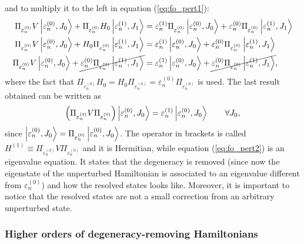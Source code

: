and to multiply it to the left in equation (\ref{eq:fo_pert1}): 
\begin{align*}
    \Pi_{\varepsilon^{(0)}_n} V \ket{\varepsilon^{(0)}_n,J_0} + \Pi_{\varepsilon^{(0)}_n} H_0 \ket{\varepsilon^{(1)}_n,J_1} &= \varepsilon^{(1)}_n \Pi_{\varepsilon^{(0)}_n} \ket{\varepsilon^{(0)}_n,J_0} + \varepsilon^{(0)}_n \Pi_{\varepsilon^{(0)}_n} \ket{\varepsilon^{(1)}_n,J_1} \\
     \Pi_{\varepsilon^{(0)}_n} V \ket{\varepsilon^{(0)}_n,J_0} +  H_0 \Pi_{\varepsilon^{(0)}_n} \ket{\varepsilon^{(1)}_n,J_1} &= \varepsilon^{(1)}_n  \ket{\varepsilon^{(0)}_n,J_0} + \varepsilon^{(0)}_n \Pi_{\varepsilon^{(0)}_n} \ket{\varepsilon^{(1)}_n,J_1} \\
      \Pi_{\varepsilon^{(0)}_n} V \ket{\varepsilon^{(0)}_n,J_0} +  \cancel{\varepsilon^{(0)}_n \Pi_{\varepsilon^{(0)}_n} \ket{\varepsilon^{(1)}_n,J_1}} &= \varepsilon^{(1)}_n  \ket{\varepsilon^{(0)}_n,J_0} + \cancel{\varepsilon^{(0)}_n \Pi_{\varepsilon^{(0)}_n} \ket{\varepsilon^{(1)}_n,J_1}},
\end{align*}
where the fact that $ \Pi_{\varepsilon^{(0)}_n} H_0 = H_0 \Pi_{\varepsilon^{(0)}_n} =\varepsilon^{(0)}_n \Pi_{\varepsilon^{(0)}_n}$ is used. The last result obtained can be written as
\begin{equation}
    \label{eq:fo_pert2}
    \left( \Pi_{\varepsilon^{(0)}_n} V \Pi_{\varepsilon^{(0)}_n} \right) \ket{\varepsilon^{(0)}_n,J_0} = \varepsilon^{(1)}_n  \ket{\varepsilon^{(0)}_n,J_0} \qquad \forall J_0,
\end{equation}
since $\ket{\varepsilon^{(0)}_n,J_0} = \Pi_{\varepsilon^{(0)}_n} \ket{\varepsilon^{(0)}_n,J_0}$. The operator in brackets is called $H^{(1)} \equiv \Pi_{\varepsilon^{(0)}_n} V \Pi_{\varepsilon^{(0)}_n}$ and it is Hermitian, while equation (\ref{eq:fo_pert2}) is an eigenvalue equation. It states that the degeneracy is removed (since now the eigenstate of the unperturbed Hamiltonian is associated to an eigenvalue different from $\varepsilon^{(0)}_n$) and how the resolved states looks like. Moreover, it is important to notice that the resolved states are not a small correction from an arbitrary unperturbed state. 

\subsubsection{Higher orders of degeneracy-removing Hamiltonians}

